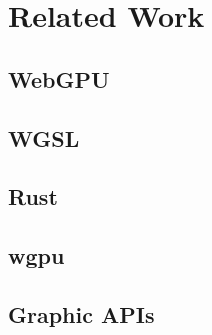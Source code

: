 \chapter{Related Work}
\label{cha:Related Work}

\section{WebGPU}
\section{WGSL}
\section{Rust}
\section{wgpu}
\section{Graphic APIs}